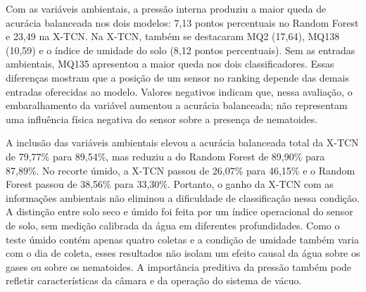 Com as variáveis ambientais, a pressão interna produziu a maior queda de
acurácia balanceada nos dois modelos: 7,13 pontos percentuais no Random Forest
e 23,49 na X-TCN. Na X-TCN, também se destacaram MQ2 (17,64), MQ138 (10,59)
e o índice de umidade do solo (8,12 pontos percentuais). Sem as entradas
ambientais, MQ135 apresentou a maior queda nos dois classificadores. Essas
diferenças mostram que a posição de um sensor no ranking depende das demais
entradas oferecidas ao modelo. Valores negativos indicam que, nessa avaliação,
o embaralhamento da variável aumentou a acurácia balanceada; não representam
uma influência física negativa do sensor sobre a presença de nematoides.

A inclusão das variáveis ambientais elevou a acurácia balanceada total da
X-TCN de 79,77\% para 89,54\%, mas reduziu a do Random Forest de 89,90\% para
87,89\%. No recorte úmido, a X-TCN passou de 26,07\% para 46,15\% e o Random
Forest passou de 38,56\% para 33,30\%. Portanto, o ganho da X-TCN com as
informações ambientais não eliminou a dificuldade de classificação nessa
condição. A distinção entre solo seco e úmido foi feita por um índice
operacional do sensor de solo, sem medição calibrada da água em diferentes
profundidades. Como o teste úmido contém apenas quatro coletas e a condição de
umidade também varia com o dia de coleta, esses resultados não isolam um efeito
causal da água sobre os gases ou sobre os nematoides. A importância preditiva
da pressão também pode refletir características da câmara e da operação do
sistema de vácuo.
